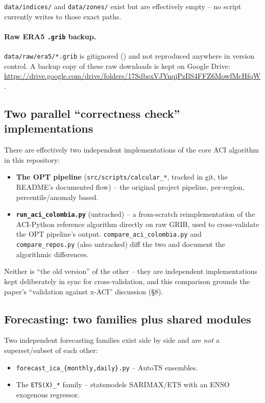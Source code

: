 \documentclass[11pt]{article}
\begin{document}
\texttt{data/indices/} and \texttt{data/zones/} exist but are effectively
empty -- no script currently writes to those exact paths.

\paragraph{Raw ERA5 \texttt{.grib} backup.} \texttt{data/raw/era5/*.grib}
is gitignored () and not reproduced anywhere in version
control. A backup copy of these raw downloads is kept on Google Drive:
\url{https://drive.google.com/drive/folders/17SdbsxVJYnqjPzIlS4FFZ6MowfMcHfqW}.

\subsection{Two parallel ``correctness check'' implementations}

There are effectively two independent implementations of the core ACI
algorithm in this repository:

\begin{itemize}[leftmargin=*]
\item \textbf{The OPT pipeline} (\texttt{src/scripts/calcular\_*}, tracked
  in git, the README's documented flow) -- the original project pipeline,
  per-region, percentile/anomaly based.
\item \textbf{\texttt{run\_aci\_colombia.py}} (untracked) -- a from-scratch
  reimplementation of the ACI-Python reference algorithm directly on raw
  GRIB, used to cross-validate the OPT pipeline's output.
  \texttt{compare\_aci\_colombia.py} and \texttt{compare\_repos.py} (also
  untracked) diff the two and document the algorithmic differences.
\end{itemize}

Neither is ``the old version'' of the other -- they are independent
implementations kept deliberately in sync for cross-validation, and this
comparison grounds the paper's ``validation against x-ACI'' discussion
(\S8).

\subsection{Forecasting: two families plus shared modules}
\label{sec:forecast-common}

Two independent forecasting families exist side by side and are \emph{not}
a superset/subset of each other:

\begin{itemize}[leftmargin=*]
\item \texttt{forecast\_ica\_\{monthly,daily\}.py} -- AutoTS ensembles.
\item The \texttt{ETS(X)\_*} family -- statsmodels SARIMAX/ETS with an
  ENSO exogenous regressor.
\end{itemize}
\end{document}
